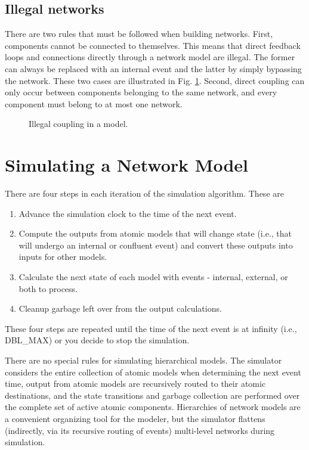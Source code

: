 \subsection{Illegal networks}
There are two rules that must be followed when building networks. First, components cannot be connected to themselves. This means that direct feedback loops and connections directly through a network model are illegal. The former can always be replaced with an internal event and the latter by simply bypassing the network. These two cases are illustrated in Fig. \ref{fig:bad_coupling}. Second, direct coupling can only occur between components belonging to the same network, and every component must belong to at most one network. 
\begin{figure}[ht]
\centering
{}
\caption{Illegal coupling in a  model.}
\label{fig:bad_coupling}
\end{figure}

\section{Simulating a Network Model}
There are four steps in each iteration of the simulation algorithm. These are
\begin{enumerate}
\item Advance the simulation clock to the time of the next event.
\item Compute the outputs from atomic models that will change state (i.e., that will undergo an internal or confluent event) and convert these outputs into inputs for other models.
\item Calculate the next state of each model with events - internal, external, or both to process.
\item Cleanup garbage left over from the output calculations.
\end{enumerate}
These four steps are repeated until the time of the next event is at infinity (i.e., DBL\_MAX) or you decide to stop the simulation. 

There are no special rules for simulating hierarchical models. The simulator considers the entire collection of atomic models when determining the next event time, output from atomic models are recursively routed to their atomic destinations, and the state transitions and garbage collection are performed over the complete set of active atomic components. Hierarchies of network models are a convenient organizing tool for the modeler, but the simulator flattens (indirectly, via its recursive routing of events) multi-level networks during simulation.

